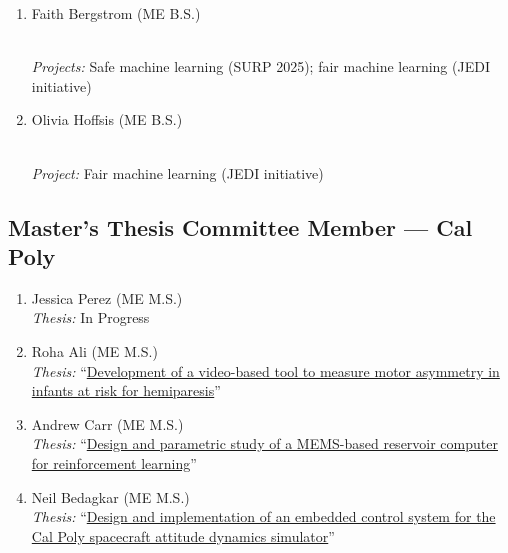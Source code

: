 \begin{enumerate}[label=\arabic*.]
	\textit{Publications:} ``\href{https://brendon-anderson.github.io/files/publications/rostermundt2025certified.pdf}{Certified adversarial robustness via mixture-of-{Gaussians} randomized smoothing}''
	\begin{student-projects}
		\\ \textit{Projects:} Safe machine learning (ME 400, RSCA-funded project)
	\end{student-projects}
	\item Faith Bergstrom (ME B.S.) 
	\begin{student-projects}
		\\ \textit{Projects:} Safe machine learning (SURP 2025); fair machine learning (JEDI initiative)
	\end{student-projects}
	\item Olivia Hoffsis (ME B.S.) 
	\begin{student-projects}
		\\ \textit{Project:} Fair machine learning (JEDI initiative)
	\end{student-projects}
\end{enumerate}

\vspace*{\subsectionskip}

\subsection{Master's Thesis Committee Member --- Cal Poly}
\begin{enumerate}[label=\arabic*.]
	\item Jessica Perez (ME M.S.)  \\
	\textit{Thesis:} In Progress
	\item Roha Ali (ME M.S.)  \\
	\textit{Thesis:} ``\href{https://digitalcommons.calpoly.edu/theses/3367/}{Development of a video-based tool to measure motor asymmetry in infants at risk for hemiparesis}''
	\item Andrew Carr (ME M.S.)  \\
	\textit{Thesis:} ``\href{https://digitalcommons.calpoly.edu/theses/3304/}{Design and parametric study of a MEMS-based reservoir computer for reinforcement learning}''
	\item Neil Bedagkar (ME M.S.)  \\
	\textit{Thesis:} ``\href{https://digitalcommons.calpoly.edu/theses/3342/}{Design and implementation of an embedded control system for the Cal Poly spacecraft attitude dynamics simulator}''
\end{enumerate}

